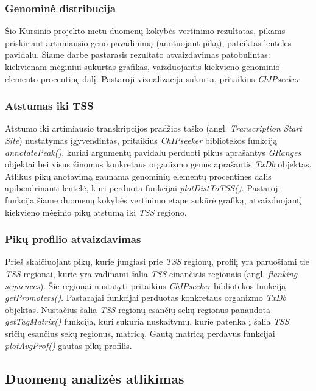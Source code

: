 \documentclass[12pt]{article}
\begin{document}
\subsubsection*{Genominė distribucija}
Šio Kursinio projekto metu duomenų kokybės vertinimo rezultatas, pikams
priskiriant artimiausio geno pavadinimą (anotuojant piką), pateiktas
lentelės pavidalu. Šiame darbe pastarasis rezultato atvaizdavimas patobulintas:
kiekvienam mėginiui sukurtas grafikas, vaizduojantis kiekvieno genominio
elemento procentinę dalį. Pastaroji vizualizacija sukurta, pritaikius
\emph{ChIPseeker}\cite{CHIPSEEKER}

\subsubsection*{Atstumas iki TSS}
Atstumo iki artimiausio transkripcijos pradžios taško
(angl. \emph{Transcription Start Site}) nustatymas įgyvendintas, pritaikius
\emph{ChIPseeker} bibliotekos funkciją \emph{annotatePeak()}, kuriai argumentų
pavidalu perduoti pikus aprašantys \emph{GRanges} objektai bei visus žinomus
konkretaus organizmo genus aprašantis \emph{TxDb} objektas. Atlikus pikų
anotavimą gaunama genominių elementų procentines dalis apibendrinanti lentelė,
kuri perduota funkcijai \emph{plotDistToTSS()}. Pastaroji funkcija šiame duomenų
kokybės vertinimo etape sukūrė grafiką, atvaizduojantį kiekvieno mėginio pikų
atstumą iki \emph{TSS} regiono.

\subsubsection*{Pikų profilio atvaizdavimas}
Prieš skaičiuojant pikų, kurie jungiasi prie \emph{TSS} regionų, profilį yra
paruošiami tie \emph{TSS} regionai, kurie yra vadinami šalia \emph{TSS}
einančiais regionais (angl. \emph{flanking sequences}). Šie regionai nustatyti
pritaikius \emph{ChIPseeker} bibliotekos funkciją \emph{getPromoters()}.
Pastarajai funkcijai perduotas konkretaus organizmo \emph{TxDb} objektas.
Nustačius šalia \emph{TSS} regionų esančių sekų regionus panaudota
\emph{getTagMatrix()} funkcija, kuri sukuria nuskaitymų, kurie patenka į šalia
\emph{TSS} sričių esančius sekų regionus, matricą. Gautą matricą perdavus
funkcijai \emph{plotAvgProf()} gautas pikų profilis.

\subsection{Duomenų analizės atlikimas}
\end{document}
